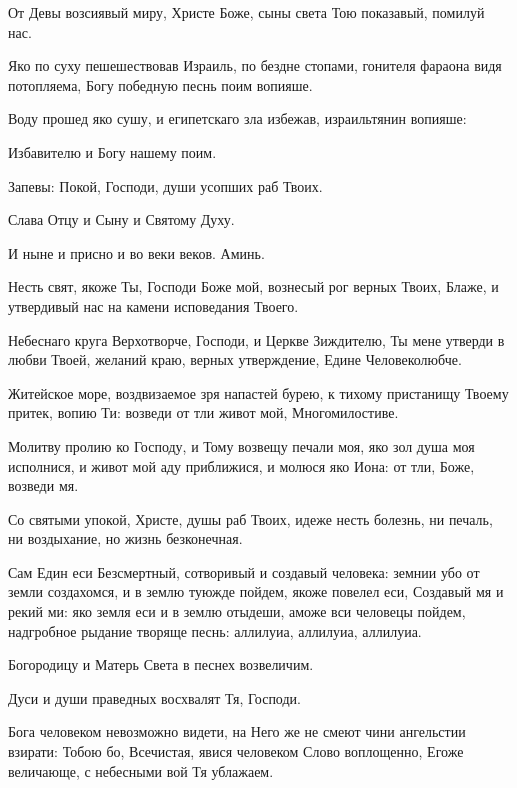 \begin{mymulticols}
\slavainynen

 От Девы возсиявый миру, Христе Боже, сыны света Тою показавый, помилуй нас.


 Яко по суху пешешествовав Израиль, по бездне стопами, гонителя фараона видя потопляема, Богу победную песнь поим вопияше. 

 Воду прошед яко сушу, и египетскаго зла избежав, израильтянин вопияше: 

Избавителю и Богу нашему поим. 

Запевы: Покой, Господи, души усопших раб Твоих. 

Слава Отцу и Сыну и Святому Духу. 

И ныне и присно и во веки веков. Аминь.

 Несть свят, якоже Ты, Господи Боже мой, вознесый рог верных Твоих, Блаже, и утвердивый нас на камени исповедания Твоего. 

 Небеснаго круга Верхотворче, Господи, и Церкве Зиждителю, Ты мене утверди в любви Твоей, желаний краю, верных утверждение, Едине Человеколюбче. 

 Житейское море, воздвизаемое зря напастей бурею, к тихому пристанищу Твоему притек, вопию Ти: возведи от тли живот мой, Многомилостиве. 

 Молитву пролию ко Господу, и Тому возвещу печали моя, яко зол душа моя исполнися, и живот мой аду приближися, и молюся яко Иона: от тли, Боже, возведи мя. 

 Со святыми упокой, Христе, душы раб Твоих, идеже несть болезнь, ни печаль, ни воздыхание, но жизнь безконечная. 

 Сам Един еси Безсмертный, сотворивый и создавый человека: земнии убо от земли создахомся, и в землю туюжде пойдем, якоже повелел еси, Создавый мя и рекий ми: яко земля еси и в землю отыдеши, аможе вси человецы пойдем, надгробное рыдание творяще песнь: аллилуиа, аллилуиа, аллилуиа. 

 Богородицу и Матерь Света в песнех возвеличим. 

 Дуси и души праведных восхвалят Тя, Господи. 

 Бога человеком невозможно видети, на Него же не смеют чини ангельстии взирати: Тобою бо, Всечистая, явися человеком Слово воплощенно, Егоже величающе, с небесными вой Тя ублажаем. 


\end{mymulticols}
